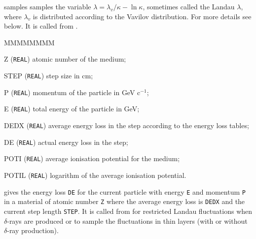  samples samples the variable
$\lambda = \lambda_v/\kappa - \ln \kappa$, sometimes called the
Landau $\lambda$, where $\lambda_v$ is distributed according
to the Vavilov distribution. For more details see below.
It is called from . 

\begin{DLtt}{MMMMMMMM}
\item[Z] ({\tt REAL}) atomic number of the medium;
\item[STEP] ({\tt REAL}) step size in cm;
\item[P] ({\tt REAL}) momentum of the particle in GeV c$^{-1}$;
\item[E] ({\tt REAL}) total energy of the particle in GeV;
\item[DEDX] ({\tt REAL}) average energy loss in the step according to
the energy loss tables;
\item[DE] ({\tt REAL}) actual energy loss in the step;
\item[POTI] ({\tt REAL}) average ionisation potential for the medium;
\item[POTIL] ({\tt REAL}) logarithm of the average ionisation potential.
\end{DLtt}

 gives the energy loss {\tt DE} for the
current particle with energy {\tt E} and momentum {\tt P}
in a material of atomic number {\tt Z} where the average
energy loss is {\tt DEDX} and the current step length {\tt STEP}.
It is called from  for restricted Landau
fluctuations when $\delta$-rays are produced or to sample
the fluctuations in thin layers (with or without $\delta$-ray
production).

